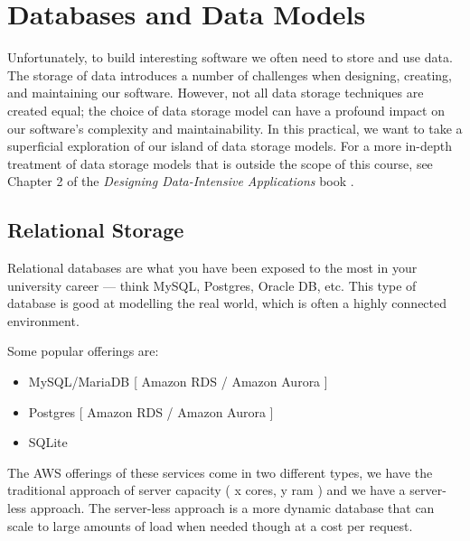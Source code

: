 \documentclass{csse4400}
\begin{document}
\section{Databases and Data Models}
Unfortunately, to build interesting software we often need to store and use data.
The storage of data introduces a number of challenges when designing, creating, and maintaining our software.
However, not all data storage techniques are created equal;
the choice of data storage model can have a profound impact on our software's complexity and maintainability.
In this practical, we want to take a superficial exploration of our island of data storage models.
For a more in-depth treatment of data storage models that is outside the scope of this course,
see Chapter 2 of the \textit{Designing Data-Intensive Applications} book \cite{data-intensive}.



\subsection{Relational Storage}

Relational databases are what you have been exposed to the most in your university career ---
think MySQL, Postgres, Oracle DB, etc.
This type of database is good at modelling the real world, which is often a highly connected environment.

Some popular offerings are:
\begin{itemize}
  \item MySQL/MariaDB [ Amazon RDS / Amazon Aurora ]
  \item Postgres [ Amazon RDS / Amazon Aurora ]
  \item SQLite
\end{itemize}

The AWS offerings of these services come in two different types, we have the traditional approach of
server capacity ( x cores, y ram ) and we have a server-less approach.
The server-less approach is a more dynamic
database that can scale to large amounts of load when needed though at a cost per request.
\end{document}
